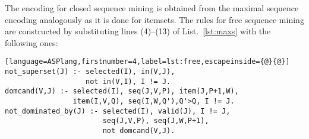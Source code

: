 The encoding for closed sequence mining is obtained from the maximal sequence encoding analogously as it is done for itemsets. The rules for free sequence mining are constructed by substituting lines (4)--(13) of List.~\ref{lst:maxs} with the following ones:


\small{\begin{lstlisting}[language=ASPlang,firstnumber=4,label=lst:free,escapeinside={@}{@}]
not_superset(J) :- selected(I), in(V,J), 
                   not in(V,I), I != J.
domcand(V,J) :- selected(I), seq(J,V,P), item(J,P+1,W), 
                item(I,V,Q), seq(I,W,Q'),Q'>Q, I != J.
not_dominated_by(J) :- selected(I), valid(J), I != J, 
                       seq(J,V,P), seq(J,W,P+1), 
                       not domcand(V,J). \end{lstlisting}}

